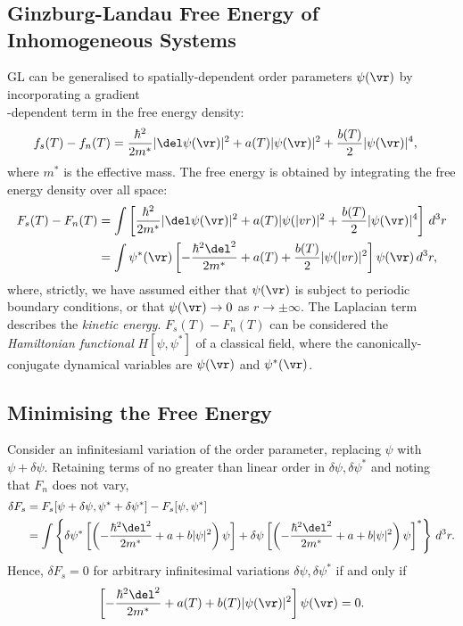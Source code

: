 \documentclass[qo.tex]{subfiles}
\begin{document}
\chapter{}
\section{Ginzburg-Landau Free Energy of Inhomogeneous Systems}
GL can be generalised to spatially-dependent order parameters $\psi(\vr)$ by incorporating a gradient \\-dependent term in the free energy density:
\begin{align}
    f_s(T) - f_n(T) &= \frac{\hbar^2}{2m^*}|\del\psi(\vr)|^2 + a(T)|\psi(\vr)|^2 + \frac{b(T)}{2}|\psi(\vr)|^4,
\end{align}
where $m^*$ is the effective mass. 
The free energy is obtained by integrating the free energy density over all space:
\begin{align}
    F_s(T) - F_n(T) &= \int \left[\frac{\hbar^2}{2m^*}|\del\psi(\vr)|^2 + a(T)|\psi(|vr)|^2 + \frac{b(T)}{2}|\psi(\vr)|^4\right]\,d^3r \\
                    &= \int \psi^*(\vr)\left[-\frac{\hbar^2\del^2}{2m^*}+a(T)+\frac{b(T)}{2}|\psi(|vr)|^2\right]\psi(\vr)\,d^3r,
\end{align}
where, strictly, we have assumed either that $\psi(\vr)$ is subject to periodic boundary conditions, or that $\psi(\vr)\to0$ as $r\to\pm\infty$.
The Laplacian term describes the \emph{kinetic energy}.
$F_s(T)-F_n(T)$ can be considered the \emph{Hamiltonian functional} $H[\psi,\psi^*]$ of a classical field, where the canonically-conjugate dynamical variables are $\psi(\vr)$ and $\psi^*(\vr)$.

\section{Minimising the Free Energy}
Consider an infinitesiaml variation of the order parameter, replacing $\psi$ with $\psi+\delta\psi$.
Retaining terms of no greater than linear order in $\delta\psi,\delta\psi^*$ and noting that $F_n$ does not vary,
\begin{align}
    \delta F_s &= F_s[\psi+\delta\psi,\psi^*+\delta\psi^*] - F_s[\psi,\psi^*] \\
               &= \int \left\{\delta\psi^*\left[\left(-\frac{\hbar^2\del^2}{2m^*}+a+b|\psi|^2\right)\psi\right] + \delta\psi\left[\left(-\frac{\hbar^2\del^2}{2m^*}+a+b|\psi|^2\right)\psi\right]^*\right\}\,d^3r.
\end{align}
Hence, $\delta F_s=0$ for arbitrary infinitesimal variations $\delta\psi,\delta\psi^*$ if and only if
\begin{align}
    \left[-\frac{\hbar^2\del^2}{2m^*}+a(T)+b(T)|\psi(\vr)|^2\right]\psi(\vr)=0.
\end{align}
\end{document}
